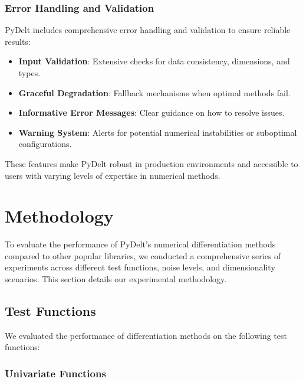 \documentclass[11pt,a4paper]{article}
\begin{document}
\subsubsection{Error Handling and Validation}

PyDelt includes comprehensive error handling and validation to ensure reliable results:

\begin{itemize}
    \item \textbf{Input Validation}: Extensive checks for data consistency, dimensions, and types.
    \item \textbf{Graceful Degradation}: Fallback mechanisms when optimal methods fail.
    \item \textbf{Informative Error Messages}: Clear guidance on how to resolve issues.
    \item \textbf{Warning System}: Alerts for potential numerical instabilities or suboptimal configurations.
\end{itemize}

These features make PyDelt robust in production environments and accessible to users with varying levels of expertise in numerical methods.

\section{Methodology}

To evaluate the performance of PyDelt's numerical differentiation methods compared to other popular libraries, we conducted a comprehensive series of experiments across different test functions, noise levels, and dimensionality scenarios. This section details our experimental methodology.

\subsection{Test Functions}

We evaluated the performance of differentiation methods on the following test functions:

\subsubsection{Univariate Functions}
\end{document}

